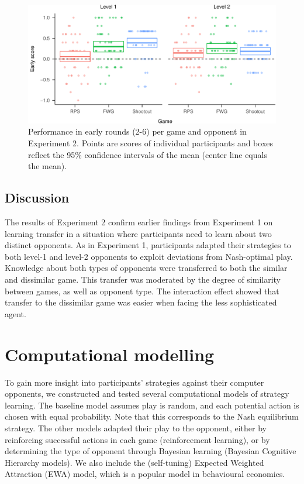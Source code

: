 \documentclass[smallextended]{svjour3}       %
\begin{document}
\begin{figure}

{\centering \includegraphics[width=\textwidth]{CBB_v2_files/figure-latex/exp2-early-score-by-opp-1} 

}

\caption{\label{ref:figure4-caption}Performance in early rounds (2-6) per game and opponent in Experiment 2. Points are scores of individual participants and boxes reflect the 95\% confidence intervals of the mean (center line equals the mean).}\label{fig:exp2-early-score-by-opp}
\end{figure}

\hypertarget{discussion}{%
\subsection{Discussion}\label{discussion}}

The results of Experiment 2 confirm earlier findings from Experiment 1
on learning transfer in a situation where participants need to learn
about two distinct opponents. As in Experiment 1, participants adapted
their strategies to both level-1 and level-2 opponents to exploit
deviations from Nash-optimal play. Knowledge about both types of
opponents were transferred to both the similar and dissimilar game. This
transfer was moderated by the degree of similarity between games, as
well as opponent type. The interaction effect showed that transfer to
the dissimilar game was easier when facing the less sophisticated agent.

\hypertarget{computational-modelling}{%
\section{Computational modelling}\label{computational-modelling}}

To gain more insight into participants' strategies against their
computer opponents, we constructed and tested several computational
models of strategy learning. The baseline model assumes play is random,
and each potential action is chosen with equal probability. Note that
this corresponds to the Nash equilibrium strategy. The other models
adapted their play to the opponent, either by reinforcing successful
actions in each game (reinforcement learning), or by determining the
type of opponent through Bayesian learning (Bayesian Cognitive Hierarchy
models). We also include the (self-tuning) Expected Weighted Attraction
(EWA) model, which is a popular model in behavioural economics.
\end{document}
